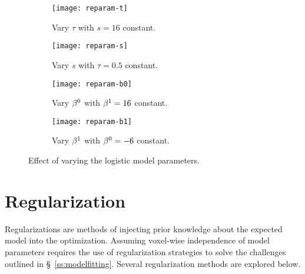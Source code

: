 \begin{figure}
  \centering
  \begin{subfigure}{\plotwidth}\texttt{[image: reparam-t]} \caption{Vary $\tau$ with $s = 16$ constant.}\label{fig:reparam-t}\end{subfigure}
  \begin{subfigure}{\plotwidth}\texttt{[image: reparam-s]} \caption{Vary $s$ with $\tau = 0.5$ constant.}\label{fig:reparam-s}\end{subfigure}
  \begin{subfigure}{\plotwidth}\texttt{[image: reparam-b0]}\caption{Vary $\beta^0$ with $\beta^1 = 16$ constant.}\label{fig:reparam-b0}\end{subfigure}
  \begin{subfigure}{\plotwidth}\texttt{[image: reparam-b1]}\caption{Vary $\beta^1$ with $\beta^0 = -6$ constant.}\label{fig:reparam-b1}\end{subfigure}
  \caption{Effect of varying the logistic model parameters.}
  \label{fig:reparam}
\end{figure}
\section{Regularization}\label{s:method-reg}
Regularizations are methods of injecting prior knowledge about the expected model into the optimization.
Assuming voxel-wise independence of model parameters requires the use of regularization strategies to solve the challenges outlined in \S\ \ref{ss:modelfitting}.
Several regularization methods are explored below.
